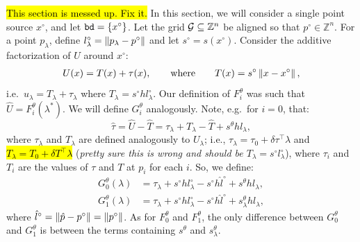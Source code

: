 \documentclass[eikonal.tex]{subfiles}
\begin{document}
\hl{This section is messed up. Fix it.} In this section, we will
consider a single point source $x^\circ$, and let
$\texttt{bd} = \left\{x^\circ\right\}$. Let the grid
$\mathcal{G} \subseteq \mathbb{Z}^n$ be aligned so that
$p^\circ \in \mathbb{Z}^n$. For a point $p_\lambda$, define
$l^\circ_\lambda = \left\|p_\lambda - p^\circ\right\|$ and let
$s^\circ = s(x^\circ)$. Consider the additive factorization of $U$
around $x^\circ$:
\begin{align}
  U(x) = T(x) + \tau(x), \qquad \text{where} \qquad T(x) = s^\circ \left\|x - x^\circ\right\|,
\end{align}
i.e.\ $u_\lambda = T_\lambda + \tau_\lambda$ where
$T_\lambda = s^\circ h l^\circ_\lambda$. Our definition of
$F_i^\theta$ was such that $\hat{U} = F_i^\theta(\lambda^*)$. We will
define $G_i^\theta$ analogously. Note, e.g.\ for $i = 0$, that:
\begin{equation}
  \hat{\tau} = \hat{U} - \hat{T} = \tau_\lambda + T_\lambda - \hat{T} + s^\theta h l_\lambda,
\end{equation}
where $\tau_\lambda$ and $T_\lambda$ are defined analogously to
$U_\lambda$; i.e., $\tau_\lambda = \tau_0 + \delta \tau^\top \lambda$
and \hl{$T_\lambda = T_0 + \delta T^\top \lambda$} (\emph{pretty sure
  this is wrong and should be $T_\lambda = s^\circ l^\circ_\lambda$}),
where $\tau_i$ and $T_i$ are the values of $\tau$ and $T$ at $p_i$ for
each $i$. So, we define:
\begin{align}
  \label{eq:Gi}
  G_0^\theta(\lambda) &= \tau_\lambda + s^\circ h l^\circ_\lambda - s^\circ h \hat{l}^\circ + s^\theta h l_\lambda, \\
  G_1^\theta(\lambda) &= \tau_\lambda + s^\circ h l^\circ_\lambda - s^\circ h \hat{l}^\circ + s^\theta_\lambda h l_\lambda,
\end{align}
where $\hat{l}^\circ = \left\|\hat{p} - p^\circ\right\| = \left\|p^\circ\right\|$. As
for $F_0^\theta$ and $F_1^\theta$, the only difference between
$G_0^\theta$ and $G_1^\theta$ is between the terms containing
$s^\theta$ and $s^\theta_\lambda$.
\end{document}
